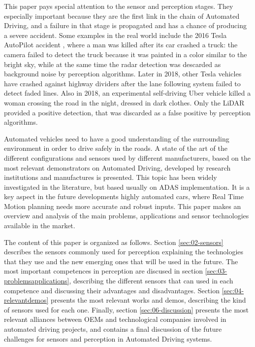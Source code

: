 This paper pays special attention to the sensor and perception stages.
They especially important because they are the first link in the chain of
Automated Driving, and a failure in that stage is propagated and has a chance
of producing a severe accident. Some examples in the real world include
the 2016 Tesla AutoPilot accident \cite{NTSB2017}, where a man was killed 
after its car crashed a truck: the camera failed to detect the truck because
it was painted in a color similar to the bright sky, while at the same time 
the radar detection was descarded as background noise by perception algorithms.
Later in 2018, other Tesla vehicles have crashed against highway dividers
after the lane following system failed to detect faded lines.
Also in 2018, an experimental self-driving Uber vehicle killed a woman
crossing the road \cite{NTSB2018} in the night, dressed in dark clothes. 
Only the LiDAR provided a positive detection, that was discarded as a false
positive by perception algorithms.

Automated vehicles need to have a good understanding of the surrounding 
environment in order to drive safely in the roads. A state of the art of the 
different configurations and sensors used by different manufacturers, based on 
the most relevant demonstrators on Automated Driving, developed by research 
institutions and manufactures is presented. This topic has been widely 
investigated in the literature, but based usually on ADAS implementation. It is 
a key aspect in the future developments highly automated cars, where Real Time 
Motion planning needs more accurate and robust inputs. This paper makes an 
overview and analysis of the main problems, applications and sensor 
technologies available in the market.

The content of this paper is organized as follows. Section \ref{sec:02-sensors} 
describes the 
sensors commonly used for perception explaining the technologies that they use 
and the new emerging ones that will be used in the future. The most important 
competences in perception are discused in section
\ref{sec:03-problemsapplications}, describing the different sensors that can
used in each competence and discussing their advantages and disadvantages. 
Section \ref{sec:04-relevantdemos} presents the most relevant works and demos, 
describing the kind of sensors used for each one. Finally, section
\ref{sec:06-discussion} presents the most relevant alliances between OEMs and 
technological companies involved in automated driving projects, and contains a
final discussion of the future challenges for sensors and perception in
Automated Driving systems.
